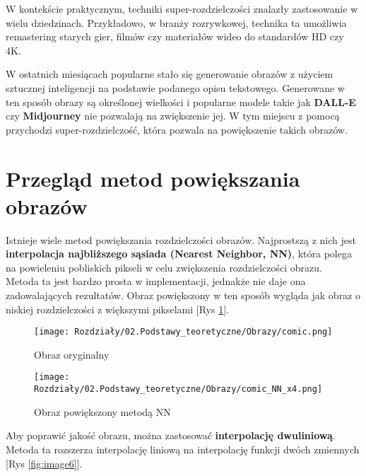 W kontekście praktycznym, techniki super-rozdzielczości znalazły zastosowanie w wielu dziedzinach. Przykładowo, w branży rozrywkowej, technika ta umożliwia remastering starych gier, filmów czy materiałów wideo do standardów HD czy 4K.

W ostatnich miesiącach popularne stało się generowanie obrazów z użyciem sztucznej inteligencji na podstawie podanego opisu tekstowego. Generowane w ten sposób obrazy są określonej wielkości i popularne modele takie jak \textbf{DALL-E} czy \textbf{Midjourney} nie pozwalają na zwiększenie jej. W tym miejscu z pomocą przychodzi super-rozdzielczość, która pozwala na powiększenie takich obrazów.


\section{Przegląd metod powiększania obrazów} \label{sec:przeglad_metod_powiekszania_obrazow}


Istnieje wiele metod powiększania rozdzielczości obrazów. Najprostszą z nich jest \textbf{interpolacja najbliższego sąsiada (Nearest Neighbor, NN)}, która polega na powieleniu pobliskich pikseli w celu zwiększenia rozdzielczości obrazu. \\
Metoda ta jest bardzo prosta w implementacji, jednakże nie daje ona zadowalających rezultatów. Obraz powiększony w ten sposób wygląda jak obraz o niskiej rozdzielczości z większymi pikselami [Rys \ref{fig:image5}]. 

\begin{figure}[ht]
    \centering
    \begin{minipage}[t]{0.25\linewidth}
        \texttt{[image: Rozdziały/02.Podstawy\_teoretyczne/Obrazy/comic.png]}
        \caption{Obraz oryginalny}
        \label{fig:image4}
    \end{minipage}
    \hspace{0.5cm}
    \begin{minipage}[t]{0.25\linewidth}
        \texttt{[image: Rozdziały/02.Podstawy\_teoretyczne/Obrazy/comic\_NN\_x4.png]}
        \caption{Obraz powiększony metodą NN}
        \label{fig:image5}
    \end{minipage}
  \end{figure}


Aby poprawić jakość obrazu, można zastosować \textbf{interpolację dwuliniową}. Metoda ta rozszerza interpolację liniową na interpolację funkcji dwóch zmiennych [Rys \ref{fig:image6}]. 



